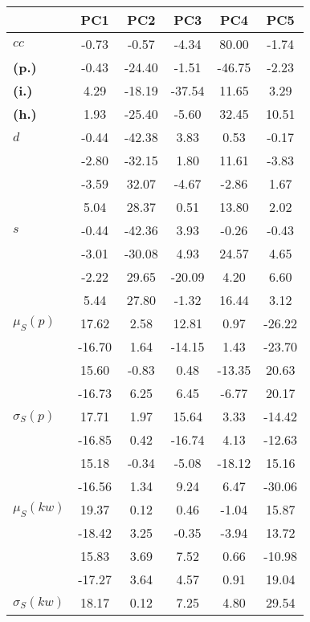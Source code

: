 \begin{table}[h!]
\begin{center}
\begin{tabular}{| l || c | c | c | c | c |}\hline
 & {\bf PC1} & {\bf PC2} & {\bf PC3} & {\bf PC4} & {\bf PC5} \\\hline\hline
{\bf $cc$} & -0.73 & -0.57 & -4.34 & 80.00 & -1.74 \\
{\bf (p.)} & -0.43 & -24.40 & -1.51 & -46.75 & -2.23 \\
{\bf (i.)} & 4.29 & -18.19 & -37.54 & 11.65 & 3.29 \\
{\bf (h.)} & 1.93 & -25.40 & -5.60 & 32.45 & 10.51 \\\hline
{\bf $d$} & -0.44 & -42.38 & 3.83 & 0.53 & -0.17 \\
{\bf } & -2.80 & -32.15 & 1.80 & 11.61 & -3.83 \\
{\bf } & -3.59 & 32.07 & -4.67 & -2.86 & 1.67 \\
{\bf } & 5.04 & 28.37 & 0.51 & 13.80 & 2.02 \\\hline
{\bf $s$} & -0.44 & -42.36 & 3.93 & -0.26 & -0.43 \\
{\bf } & -3.01 & -30.08 & 4.93 & 24.57 & 4.65 \\
 & -2.22  & 29.65  & -20.09  & 4.20  & 6.60 \\
 & 5.44  & 27.80  & -1.32  & 16.44  & 3.12 \\\hline
$\mu_S(p)$ & 17.62  & 2.58  & 12.81  & 0.97  & -26.22 \\
 & -16.70  & 1.64  & -14.15  & 1.43  & -23.70 \\
 & 15.60  & -0.83  & 0.48  & -13.35  & 20.63 \\
 & -16.73  & 6.25  & 6.45  & -6.77  & 20.17 \\\hline
$\sigma_S(p)$ & 17.71  & 1.97  & 15.64  & 3.33  & -14.42 \\
 & -16.85  & 0.42  & -16.74  & 4.13  & -12.63 \\
 & 15.18  & -0.34  & -5.08  & -18.12  & 15.16 \\
 & -16.56  & 1.34  & 9.24  & 6.47  & -30.06 \\\hline
$\mu_S(kw)$ & 19.37  & 0.12  & 0.46  & -1.04  & 15.87 \\
 & -18.42  & 3.25  & -0.35  & -3.94  & 13.72 \\
 & 15.83  & 3.69  & 7.52  & 0.66  & -10.98 \\
 & -17.27  & 3.64  & 4.57  & 0.91  & 19.04 \\\hline
$\sigma_S(kw)$ & 18.17  & 0.12  & 7.25  & 4.80  & 29.54 \\

\end{tabular}
\end{center}
\end{table}
